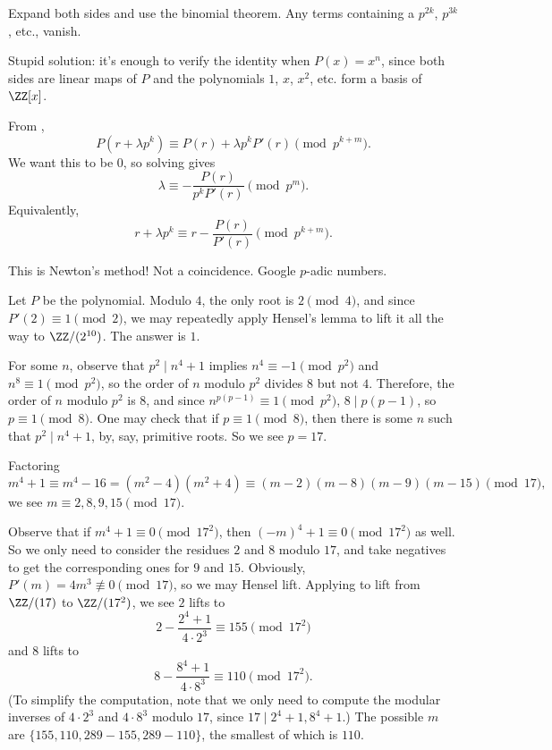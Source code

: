 \documentclass[11pt]{scrartcl}
\begin{document}
\begin{solution}{}
	Expand both sides and use the binomial theorem. Any terms containing a $p^{2k}$, $p^{3k}$, etc., vanish.

	Stupid solution: it's enough to verify the identity when $P(x) = x^n$, since both sides are linear maps of $P$ and the polynomials $1$, $x$, $x^2$, etc. form a basis of $\ZZ[x]$.
\end{solution}

\begin{solution}{}
	From ,
	\[P(r + \lambda p^k) \equiv P(r) + \lambda p^kP'(r) \pmod{p^{k + m}}.\]
	We want this to be $0$, so solving gives
	\[\lambda \equiv -\frac{P(r)}{p^kP'(r)} \pmod{p^m}.\]
	Equivalently,
	\[r + \lambda p^k \equiv r - \frac{P(r)}{P'(r)} \pmod{p^{k + m}}.\]

	This is Newton's method! Not a coincidence. Google $p$-adic numbers.
\end{solution}

\begin{solution}{}
	Let $P$ be the polynomial. Modulo $4$, the only root is $2 \pmod 4$, and since $P'(2) \equiv 1 \pmod 2$, we may repeatedly apply Hensel's lemma to lift it all the way to $\ZZ/(2^{10})$. The answer is $1$.
\end{solution}

\begin{solution}{}
	For some $n$, observe that $p^2 \mid n^4 + 1$ implies $n^4 \equiv -1 \pmod{p^2}$ and $n^8 \equiv 1 \pmod{p^2}$, so the order of $n$ modulo $p^2$ divides $8$ but not $4$. Therefore, the order of $n$ modulo $p^2$ is $8$, and since $n^{p(p - 1)} \equiv 1 \pmod{p^2}$, $8 \mid p(p - 1)$, so $p \equiv 1 \pmod 8$. One may check that if $p \equiv 1 \pmod 8$, then there is some $n$ such that $p^2 \mid n^4 + 1$, by, say, primitive roots. So we see $p = 17$.
	
	Factoring
	\[m^4 + 1 \equiv m^4 - 16 = (m^2 - 4)(m^2 + 4) \equiv (m - 2)(m - 8)(m - 9)(m - 15) \pmod{17},\]
	we see $m \equiv 2,8,9,15 \pmod{17}$.

	Observe that if $m^4 + 1 \equiv 0 \pmod{17^2}$, then $(-m)^4 + 1 \equiv 0 \pmod{17^2}$ as well. So we only need to consider the residues $2$ and $8$ modulo $17$, and take negatives to get the corresponding ones for $9$ and $15$. Obviously, $P'(m) = 4m^3 \not\equiv 0 \pmod{17}$, so we may Hensel lift. Applying  to lift from $\ZZ/(17)$ to $\ZZ/(17^2)$, we see $2$ lifts to
	\[2 - \frac{2^4 + 1}{4 \cdot 2^3} \equiv 155 \pmod{17^2}\]
	and $8$ lifts to
	\[8 - \frac{8^4 + 1}{4 \cdot 8^3} \equiv 110 \pmod{17^2}.\]
	(To simplify the computation, note that we only need to compute the modular inverses of $4 \cdot 2^3$ and $4 \cdot 8^3$ modulo $17$, since $17 \mid 2^4 + 1,8^4 + 1$.) The possible $m$ are $\{155,110,289 - 155,289 - 110\}$, the smallest of which is $110$.
\end{solution}
\end{document}
